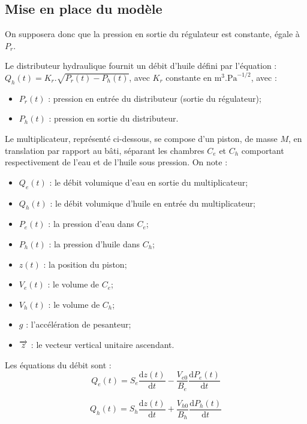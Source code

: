 \documentclass[10pt,fleqn]{article} %
\begin{document}
\begin{multicols}{2}
\subsection*{Mise en place du modèle}

On supposera donc que la pression en sortie du régulateur est constante, égale à $P_r$.

Le distributeur hydraulique fournit un débit d’huile défini par l’équation : 
	$Q_h (t)=K_r.\sqrt{P_r (t)-P_h (t)}$, avec $K_r$ constante en $\text{m}^3.\text{Pa}^{-1/2}$, avec :
\begin{itemize}
\item $P_r(t)$ : pression en entrée du distributeur (sortie du régulateur);
\item $P_h(t)$ : pression en sortie du distributeur.
\end{itemize}



Le multiplicateur, représenté ci-dessous, se compose d’un piston, de masse $M$, en translation par rapport au bâti, séparant les chambres $C_e$ et $C_h$ comportant respectivement de l’eau et de l’huile sous pression.
On note :
\begin{itemize}
\item $Q_e(t)$ : le débit volumique d’eau en sortie du multiplicateur;
\item $Q_h(t)$ : le débit volumique d’huile en entrée du multiplicateur;
\item $P_e(t)$ : la pression d’eau dans $C_e$;
\item $P_h(t)$ : la pression d’huile dans $C_h$;
\item $z(t)$ : la position du piston;
\item $V_e(t)$ : le volume de $C_e$;
\item $V_h(t)$ : le volume de $C_h$;
\item $g$ : l’accélération de pesanteur;
\item $\overrightarrow{z}$ : le vecteur vertical unitaire ascendant.
\end{itemize}

Les équations du débit sont : 
$$
	Q_e (t)=S_e\dfrac{\text{d}z(t)}{\text{d}t}-\dfrac{V_{e0}}{B_e}   \dfrac{\text{d}P_e (t)}{\text{d}t}
$$

$$
	Q_h (t)=S_h\dfrac{\text{d}z(t)}{\text{d}t}+\dfrac{V_{h0}}{B_h}   \dfrac{\text{d}P_h (t)}{\text{d}t}
$$


\end{multicols}
\end{document}
